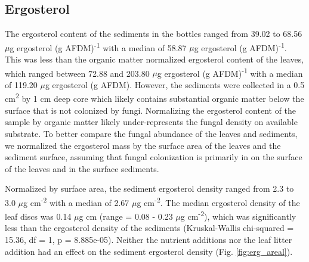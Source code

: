 \subsection{Ergosterol}

The ergosterol content of the sediments in the bottles ranged from 39.02 to 68.56 $\mu$g ergosterol (g AFDM)\textsuperscript{-1} with a median of 58.87 $\mu$g ergosterol (g AFDM)\textsuperscript{-1}. This was less than the organic matter normalized ergosterol content of the leaves, which ranged between 72.88 and 203.80 $\mu$g ergosterol (g AFDM)\textsuperscript{-1} with a median of 119.20 $\mu$g ergosterol (g AFDM). However, the sediments were collected in a 0.5 cm\textsuperscript{2} by 1 cm deep core which likely contains substantial organic matter below the surface that is not colonized by fungi. Normalizing the ergosterol content of the sample by organic matter likely under-represents the fungal density on available substrate.  To better compare the fungal abundance of the leaves and sediments, we normalized the ergosterol mass by the surface area of the leaves and the sediment surface, assuming that fungal colonization is primarily in on the surface of the leaves and in the surface sediments.

Normalized by surface area, the sediment ergosterol density ranged from 2.3 to 3.0 $\mu$g cm\textsuperscript{-2} with a median of 2.67 $\mu$g cm\textsuperscript{-2}. The median ergosterol density of the leaf discs was 0.14 $\mu$g cm (range = 0.08 - 0.23 $\mu$g cm\textsuperscript{-2}), which was significantly less than the ergosterol density of the sediments (Kruskal-Wallis chi-squared = 15.36, df = 1, p = 8.885e-05). Neither the nutrient additions nor the leaf litter addition had an effect on the sediment ergosterol density (Fig. \ref{fig:erg_areal}). %
